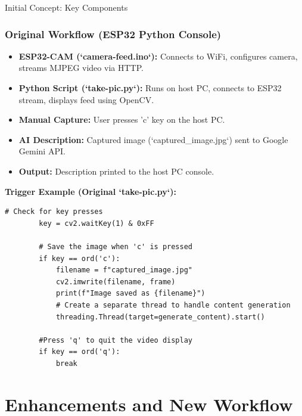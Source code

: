 \documentclass{beamer}
\begin{document}
\begin{frame}[fragile]{Initial Concept: Key Components}
 \frametitle{Original Workflow (ESP32 \textrightarrow Python \textrightarrow Console)}
    \begin{itemize}
        \item \textbf{ESP32-CAM (`camera-feed.ino`):} Connects to WiFi, configures camera, streams MJPEG video via HTTP.
        \item \textbf{Python Script (`take-pic.py`):} Runs on host PC, connects to ESP32 stream, displays feed using OpenCV.
        \item \textbf{Manual Capture:} User presses 'c' key on the host PC.
        \item \textbf{AI Description:} Captured image (`captured\_image.jpg`) sent to Google Gemini API.
        \item \textbf{Output:} Description printed to the host PC console.
    \end{itemize}

    \vspace{0.5em}
    \textbf{Trigger Example (Original `take-pic.py`):}
    \begin{lstlisting}[style=custompy, firstnumber=58]
        # Check for key presses
        key = cv2.waitKey(1) & 0xFF

        # Save the image when 'c' is pressed
        if key == ord('c'):
            filename = f"captured_image.jpg"
            cv2.imwrite(filename, frame)
            print(f"Image saved as {filename}")
            # Create a separate thread to handle content generation
            threading.Thread(target=generate_content).start()

        #Press 'q' to quit the video display
        if key == ord('q'):
            break
    \end{lstlisting}
\end{frame}

\section{Enhancements and New Workflow}
\end{document}
